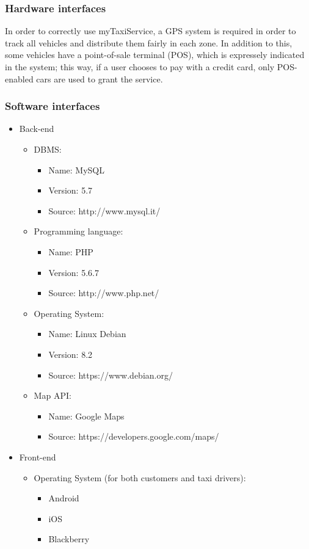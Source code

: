 \pagebreak
\subsubsection{Hardware interfaces}
In order to correctly use myTaxiService, a GPS system is required in order to track all vehicles and distribute them fairly in each zone. In addition to this, some vehicles have a point-of-sale terminal (POS), which is expressely indicated in the system; this way, if a user chooses to pay with a credit card, only POS-enabled cars are used to grant the service.

\subsubsection{Software interfaces}
\begin{itemize}
\item Back-end
\begin{itemize}
	\item DBMS:
	\begin{itemize}
		\item Name: MySQL
		\item Version: 5.7
		\item Source: http://www.mysql.it/
	\end{itemize}
	
	\item Programming language:
	\begin{itemize}
		\item Name: PHP
		\item Version: 5.6.7
		\item Source: http://www.php.net/
	\end{itemize}
	
	\item Operating System:
	\begin{itemize}
		\item Name: Linux Debian
		\item Version: 8.2
		\item Source: https://www.debian.org/
	\end{itemize}	
	
	\item Map API:
	\begin{itemize}
		\item Name: Google Maps
		\item Source: https://developers.google.com/maps/
	\end{itemize}	
\end{itemize}

\item Front-end
\begin{itemize}
\item Operating System (for both customers and taxi drivers):
	\begin{itemize}
		\item Android
		\item iOS
		\item Blackberry
	\end{itemize}
\end{itemize}
\end{itemize}

